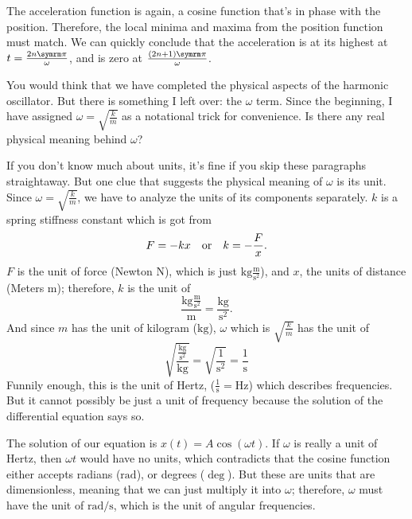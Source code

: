 The acceleration function is again, a cosine function that's in phase with the position. Therefore, the local minima and maxima from the position function must match. We can quickly conclude that the acceleration is at its highest at \(t = \frac{2n\cpi}{\omega}\), and is zero at \(\frac{(2n + 1)\cpi}{\omega}\).

You would think that we have completed the physical aspects of the harmonic oscillator. But there is something I left over: the \(\omega\) term. Since the beginning, I have assigned \(\omega = \sqrt{\frac{k}{m}}\) as a notational trick for convenience. Is there any real physical meaning behind \(\omega\)?

If you don't know much about units, it's fine if you skip these paragraphs straightaway. But one clue that suggests the physical meaning of \(\omega\) is its unit. Since \(\omega = \sqrt{\frac{k}{m}}\), we have to analyze the units of its components separately. \(k\) is a spring stiffness constant which is got from
\begin{equation}
  F = -kx \quad\textrm{or}\quad k = -\frac{F}{x}.
\end{equation}
\(F\) is the unit of force (Newton \(\unit{\newton}\)), which is just \(\unit{\kilogram}\frac{\unit{\meter}}{\unit{\second^2}}\)), and \(x\), the units of distance (Meters \(\unit{\meter}\)); therefore, \(k\) is the unit of
\begin{equation}
  \frac{\unit{\kilogram}\frac{\unit{\meter}}{\unit{\second^2}}}{\unit{\meter}} = \frac{\unit{\kilogram}}{\unit{\second^2}}.
\end{equation}
And since \(m\) has the unit of kilogram (\(\unit{\kilogram}\)), \(\omega\) which is \(\sqrt{\frac{k}{m}}\) has the unit of
\begin{equation}
  \sqrt{\frac{\frac{\unit{\kilogram}}{\unit{\second^2}}}{\unit{\kilogram}}} = \sqrt{\frac{1}{\unit{\second^2}}} = \frac{1}{\unit{\second}}
\end{equation}
Funnily enough, this is the unit of Hertz, (\(\frac{1}{\unit{\second}} = \unit{\hertz}\)) which describes frequencies. But it cannot possibly be just a unit of frequency because the solution of the differential equation says so.

The solution of our equation is \(x(t) = A\cos(\omega t)\). If \(\omega\) is really a unit of Hertz, then \(\omega t\) would have no units, which contradicts that the cosine function either accepts radians (\(\unit{\radian}\)), or degrees (\(\unit{\deg}\)). But these are units that are dimensionless, meaning that we can just multiply it into \(\omega\); therefore, \(\omega\) must have the unit of \(\unit{\radian\per\second}\), which is the unit of angular frequencies.

